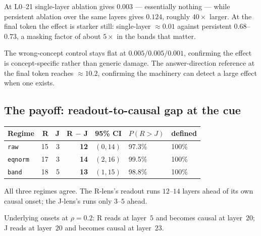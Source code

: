 \documentclass[11pt,a4paper]{article}
\newcommand{\jlens}{J\nobreakdash-lens}
\newcommand{\rlens}{R\nobreakdash-lens}
\begin{document}
\noindent
At L0--21 single-layer ablation gives $0.003$ --- essentially nothing --- while
persistent ablation over the same layers gives $0.124$, roughly $40\times$ larger. At
the final token the effect is starker still: single-layer $\approx 0.01$ against
persistent $0.68$--$0.73$, a masking factor of about $5\times$ in the bands that
matter.

\medskip
\noindent{}

\noindent
The wrong-concept control stays flat at $0.005/0.005/0.001$, confirming the effect is
concept-specific rather than generic damage. The answer-direction reference at the
final token reaches $\approx 10.2$, confirming the machinery can detect a large effect
when one exists.

\subsection{The payoff: readout-to-causal gap at the cue}

\begin{center}
\begin{tabular}{@{}lrrrlll@{}}
\toprule
\textbf{Regime} & \textbf{R} & \textbf{J} & \textbf{R $-$ J} & \textbf{95\% CI} & \textbf{$P(R{>}J)$} & \textbf{defined} \\
\midrule
\texttt{raw}    & 15 & 3 & \textbf{12} & $(0, 14)$ & 97.3\% & 100\% \\
\texttt{eqnorm} & 17 & 3 & \textbf{14} & $(2, 16)$ & 99.5\% & 100\% \\
\texttt{band}   & 18 & 5 & \textbf{13} & $(1, 15)$ & 98.8\% & 100\% \\
\bottomrule
\end{tabular}
\end{center}

\noindent
All three regimes agree. The \rlens's readout runs $12$--$14$ layers ahead of its own
causal onset; the \jlens's runs only $3$--$5$ ahead.

Underlying onsets at $\rho = 0.2$: R reads at layer~$5$ and becomes causal at
layer~$20$; J reads at layer~$20$ and becomes causal at layer~$23$.
\end{document}
